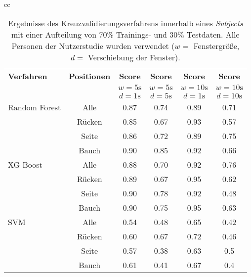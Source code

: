 \begin{table}[ht]
  \begin{tabular}{cc}
    \begin{minipage}{1\textwidth}
      \begin{center}
          \begin{tabular}{ | l | c | c | c | c | c | }
            \hline
            \textbf{Verfahren} & \textbf{Positionen} & \textbf{Score} & \textbf{Score} & \textbf{Score} & \textbf{Score} \\ 
            & & \textbf{$w=5\si{\s}$} & \textbf{$w=5\si{\s}$} & \textbf{$w=10\si{\s}$} & \textbf{$w=10\si{\s}$} \\
            & & \textbf{$d=1\si{\s}$} & \textbf{$d=5\si{\s}$} & \textbf{$d=1\si{\s}$} & \textbf{$d=10\si{\s}$} \\ \hline
            Random Forest & Alle &  0.87 & 0.74 & 0.89 & 0.71 \\ 
             & Rücken & 0.85 & 0.67 & 0.93 & 0.57 \\
             & Seite  & 0.86 & 0.72 & 0.89 & 0.75 \\
             & Bauch  & 0.90 & 0.85 & 0.92 & 0.66 \\ \hline
            XG Boost  & Alle & 0.88 & 0.70 & 0.92 & 0.76 \\ 
             & Rücken & 0.89 & 0.67 & 0.95 & 0.62 \\
             & Seite  & 0.90 & 0.78 & 0.92 & 0.48 \\
             & Bauch  & 0.90 & 0.75 & 0.95 & 0.63 \\ \hline
            SVM & Alle& 0.54 & 0.48 & 0.65 & 0.42 \\ 
             & Rücken & 0.60 & 0.67 & 0.72 & 0.46 \\
             & Seite  & 0.57 & 0.38 & 0.63 & 0.5 \\
             & Bauch  & 0.61 & 0.41 & 0.67 & 0.4 \\
            \hline
          \end{tabular}
      \end{center}
    \end{minipage}
  \end{tabular}

  \caption{Ergebnisse des Kreuzvalidierungsverfahrens innerhalb eines \textit{Subjects} mit einer Aufteilung von 70\% Trainings- und 30\% Testdaten. Alle Personen der Nutzerstudie wurden verwendet ($w=$ Fenstergröße, $d=$ Verschiebung der Fenster).}
  \label{evaluation:within_subject_results}
\end{table}

